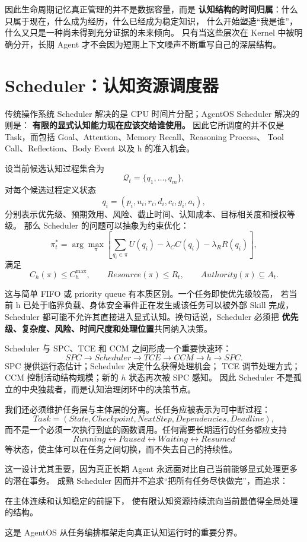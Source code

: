 因此生命周期记忆真正管理的并不是数据容量，而是
\textbf{认知结构的时间归属}：什么只属于现在，什么成为经历，什么已经成为稳定知识，
什么开始塑造``我是谁''，什么又只是一种尚未得到充分证据的未来倾向。
只有当这些层次在 Kernel 中被明确分开，长期 Agent 才不会因为短期上下文噪声不断重写自己的深层结构。


\section{Scheduler：认知资源调度器}

传统操作系统 Scheduler 解决的是 CPU 时间片分配；AgentOS Scheduler 解决的则是：
\textbf{有限的显式认知能力现在应该交给谁使用。}
因此它所调度的并不仅是 Task，而包括 Goal、Attention、Memory Recall、Reasoning Process、
Tool Call、Reflection、Body Event 以及 h 的准入机会。

设当前候选认知过程集合为
\[
\mathcal Q_t=\{q_1,\ldots,q_m\},
\]
对每个候选过程定义状态
\[
q_i=
(
p_i,
u_i,
r_i,
d_i,
c_i,
g_i,
a_i
),
\]
分别表示优先级、预期效用、风险、截止时间、认知成本、目标相关度和授权等级。
那么 Scheduler 的问题可以抽象为约束优化：
\[
\pi_t^\ast
=
\arg\max_{\pi}
\left[
\sum_{q_i\in\pi}
U(q_i)
-
\lambda_C C(q_i)
-
\lambda_R R(q_i)
\right],
\]
满足
\[
C_h(\pi)\leq C_h^{\max},
\qquad
Resource(\pi)\leq R_t,
\qquad
Authority(\pi)\subseteq A_t.
\]

这与简单 FIFO 或 priority queue 有本质区别。一个任务即使优先级较高，
若当前 h 已处于临界负载、身体安全事件正在发生或该任务可以被外部 Skill 完成，
Scheduler 都可能不允许其直接进入显式认知。换句话说，Scheduler 必须把
\textbf{优先级、复杂度、风险、时间尺度和处理位置}共同纳入决策。

Scheduler 与 SPC、TCE 和 CCM 之间形成一个重要快速环：
\[
SPC
\rightarrow
Scheduler
\rightarrow
TCE
\rightarrow
CCM
\rightarrow
h
\rightarrow
SPC.
\]
SPC 提供运行态估计；Scheduler 决定什么获得处理机会；
TCE 调节处理方式；CCM 控制活动结构规模；新的 $h$ 状态再次被 SPC 感知。
因此 Scheduler 不是孤立的中央独裁者，而是认知治理闭环中的决策节点。

我们还必须维护任务层与主体层的分离。长任务应被表示为可中断过程：
\[
Task
=
(State,Checkpoint,NextStep,Dependencies,Deadline),
\]
而不是一个必须一次执行到底的函数调用。任何需要长期运行的任务都应支持
\[
Running
\leftrightarrow
Paused
\leftrightarrow
Waiting
\leftrightarrow
Resumed
\]
等状态，使主体可以在任务之间切换，而不失去自己的持续性。

这一设计尤其重要，因为真正长期 Agent 永远面对比自己当前能够显式处理更多的潜在事务。
成熟 Scheduler 因而并不追求``把所有任务尽快做完''，而追求：
\begin{statementbox}
在主体连续和认知稳定的前提下，
使有限认知资源持续流向当前最值得全局处理的结构。
\end{statementbox}
这是 AgentOS 从任务编排框架走向真正认知运行时的重要分界。


